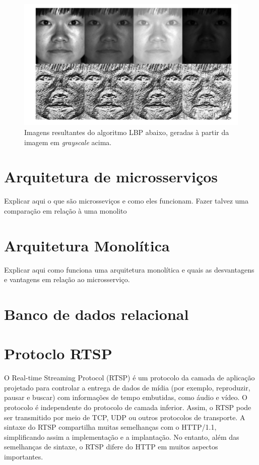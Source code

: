 \documentclass[12pt, %
openright, 
oneside, %
a4paper,    %
brazil]{facom-ufu-abntex2}
\begin{document}
\begin{figure}[!ht]
	\centering
	\includegraphics[width=0.7\linewidth]{grayscale.PNG}
	\caption[De \emph{grayscale} para LBP
	]{Imagens resultantes do algoritmo LBP abaixo, geradas à partir da imagem em \emph{grayscale} acima.}
	\label{fig:graficosVariandoTamanhoRede}
\end{figure}

\section{Arquitetura de microsserviços}

Explicar aqui o que são microsseviços e como eles funcionam. Fazer talvez uma
comparação em relação à uma monolito

\section{Arquitetura Monolítica}

Explicar aqui como funciona uma arquitetura monolítica e quais as desvantagens
e vantagens em relação ao microsserviço.

\section{Banco de dados relacional}

\section{Protoclo RTSP}

O Real-time Streaming Protocol (RTSP) é um protocolo da camada de aplicação
projetado para controlar a entrega de dados de mídia (por exemplo, reproduzir,
pausar e buscar) com informações de tempo embutidas, como áudio e vídeo. O
protocolo é independente do protocolo de camada inferior. Assim, o RTSP pode
ser transmitido por meio de TCP, UDP ou outros protocolos de transporte. A
sintaxe do RTSP compartilha muitas semelhanças com o HTTP/1.1, simplificando
assim a implementação e a implantação. No entanto, além das semelhanças de
sintaxe, o RTSP difere do HTTP em muitos aspectos importantes.
\end{document}

